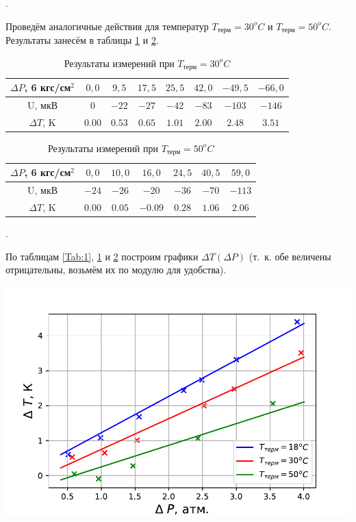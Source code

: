 \documentclass[a4paper, 12pt]{article}
\newcounter{Points}
\newcommand{\point}{\arabic{Points}. \addtocounter{Points}{1}}
\begin{document}
\point Проведём аналогичные действия для температур $T_{\text{терм}} = 30^o C$ и $T_{\text{терм}} = 50^o C$. Результаты занесём в таблицы \ref{Tab:2} и \ref{Tab:3}.

\begin{table}[!h]
\begin{tabular}{|c|c|c|c|c|c|c|c|}
    \hline
    $\Delta P$, 6 кгс/см$^2$ & $0,0$ & $9,5$ & $17,5$ & $25,5$ & $42,0
    $ & $-49,5$ & $-66,0$ 
    \\ \hline
    U, мкВ & $0$ & $-22$ & $-27$ & $-42$ & $-83$ & $-103$ & $-146$ 
    \\ \hline
    $\Delta T$, K & $0.00$ & $0.53$ & $0.65$ & $1.01$ & $2.00$ & $2.48$ & $3.51$
    \\ \hline  
\end{tabular}
\caption{Результаты измерений при $T_{\text{терм}} = 30^o C$}
\label{Tab:2}
\end{table}

\begin{table}[!h]
\begin{tabular}{|c|c|c|c|c|c|c|}
    \hline
    $\Delta P$, 6 кгс/см$^2$ & $0,0$ & $10,0$ & $16,0$ & $24,5$ & $40,5$ & $59,0$ 
    \\ \hline
    U, мкВ & $-24$ & $-26$ & $-20$ & $-36$ & $-70$ & $-113$
    \\ \hline
    $\Delta T$, K & $0.00$ & $0.05$ & $-0.09$ & $0.28$ & $1.06$ & $2.06$
    \\ \hline  
\end{tabular}
\caption{Результаты измерений при $T_{\text{терм}} = 50^o C$}
\label{Tab:3}
\end{table}

\point По таблицам \ref{Tab:1}, \ref{Tab:2} и \ref{Tab:3} построим графики $\Delta T (\Delta P)$ (т.~к. обе величены отрицательны, возьмём их по модулю для удобства).

\includegraphics[scale = 0.8]{graph}
\end{document}
